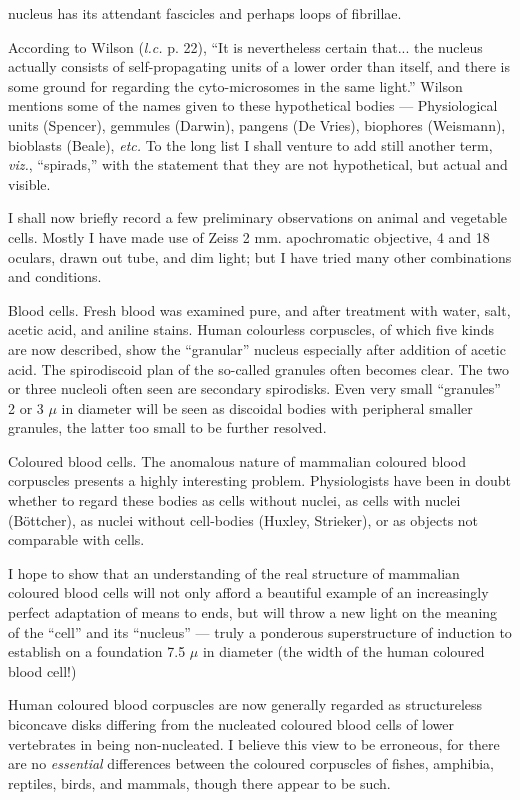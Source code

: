 \documentclass[a4paper, 12pt, oneside, landscape]{article}
\begin{document}
nucleus has its attendant fascicles and perhaps loops of fibrillae.

According to Wilson (\emph{l.c.} p. 22), ``It is nevertheless certain that... the nucleus actually consists of self-propagating units of a lower order than itself, and there is some ground for regarding the cyto-microsomes in the same light.'' Wilson mentions some of the names given to these hypothetical bodies --- Physiological units (Spencer), gemmules (Darwin), pangens (De Vries), biophores (Weismann), bioblasts (Beale), \emph{etc.} To the long list I shall venture to add still another term, \emph{viz.}, ``spirads,'' with the statement that they are not hypothetical, but actual and visible.

I shall now briefly record a few preliminary observations on animal and vegetable cells. Mostly I have made use of Zeiss 2 mm. apochromatic objective, 4 and 18 oculars, drawn out tube, and dim light; but I have tried many other combinations and conditions.

Blood cells. Fresh blood was examined pure, and after treatment with water, salt, acetic acid, and aniline stains. Human colourless corpuscles, of which five kinds are now described, show the ``granular'' nucleus especially after addition of acetic acid. The spirodiscoid plan of the so-called granules often becomes clear. The two or three nucleoli often seen are secondary spirodisks. Even very small ``granules'' 2 or 3 $\mu$ in diameter will be seen as discoidal bodies with peripheral smaller granules, the latter too small to be further resolved.

Coloured blood cells. The anomalous nature of mammalian coloured blood corpuscles presents a highly interesting problem. Physiologists have been in doubt whether to regard these bodies as cells without nuclei, as cells with nuclei (Böttcher), as nuclei without cell-bodies (Huxley, Strieker), or as objects not comparable with cells.

I hope to show that an understanding of the real structure of mammalian coloured blood cells will not only afford a beautiful example of an increasingly perfect adaptation of means to ends, but will throw a new light on the meaning of the ``cell'' and its ``nucleus'' --- truly a ponderous superstructure of induction to establish on a foundation 7.5 $\mu$ in diameter (the width of the human coloured blood cell!)

Human coloured blood corpuscles are now generally regarded as structureless biconcave disks differing from the nucleated coloured blood cells of lower vertebrates in being non-nucleated. I believe this view to be erroneous, for there are no \emph{essential} differences between the coloured corpuscles of fishes, amphibia, reptiles, birds, and mammals, though there appear to be such.
\end{document}
